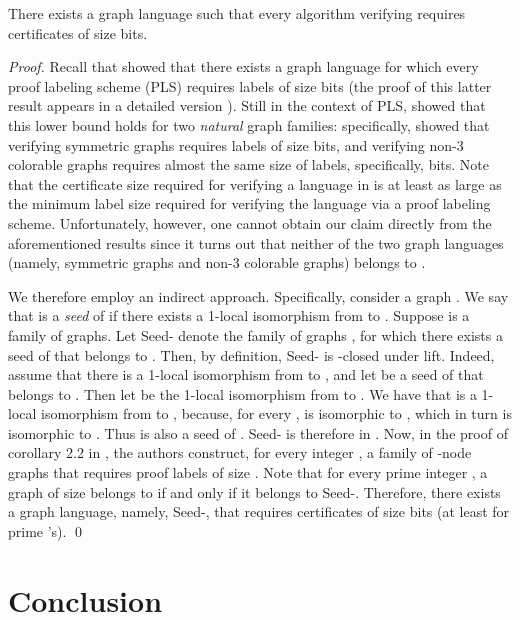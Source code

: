 \documentclass{llncs}
\begin{document}
\begin{proposition}
 There exists a graph language  such that every algorithm verifying  requires certificates of size  bits.
\end{proposition}
\begin{proof}

Recall that  \cite{KKP10} showed that there exists a graph language for which every proof labeling scheme (PLS) requires labels of size  bits (the proof of this latter result appears in a detailed version \cite{KKP10b}). 
Still in the context of PLS, \cite{GS11} showed that this lower bound holds for  two {\em natural} graph families: specifically, \cite{GS11}  showed that verifying symmetric graphs requires labels of size  bits, and verifying   non-3 colorable graphs requires almost the same size of labels, specifically,  bits. Note that  the certificate size required for verifying a language  in  is at least as large as the minimum label size required for verifying the language via a proof labeling scheme. 
Unfortunately, however, one cannot obtain our claim directly from the aforementioned results since it turns out that neither of the two graph languages (namely, symmetric graphs and non-3 colorable graphs) belongs to .

We therefore employ an indirect approach.
Specifically, consider a graph . We say that  is a {\em seed} of  if there exists a 1-local isomorphism from  to .
Suppose  is a family of graphs. Let \textsf{Seed-} denote the family of graphs , for which there exists a seed of   that belongs to . 
Then, by definition, \textsf{Seed-} is  -closed under lift.  Indeed, assume that there is a 1-local isomorphism   from  to , and let  be a seed of  that belongs to . Then let  be the 1-local isomorphism  from  to . We have that  is a 1-local isomorphism  from  to , because, for every ,  is isomorphic to , which in turn is isomorphic to . Thus  is also a seed of .  \textsf{Seed-} is therefore in . Now, in the proof of corollary 2.2 in  \cite{KKP10b}, the authors construct, for every integer  , a family   of -node graphs that requires proof labels of size . Note that  for every prime integer , a graph  of size  belongs to   if and only if it belongs to 
\textsf{Seed-}.  Therefore, there exists a graph language, namely,   \textsf{Seed-}, that requires  certificates of size  bits (at least for prime 's).
\qed
\end{proof}

\section{Conclusion}
\end{document}
